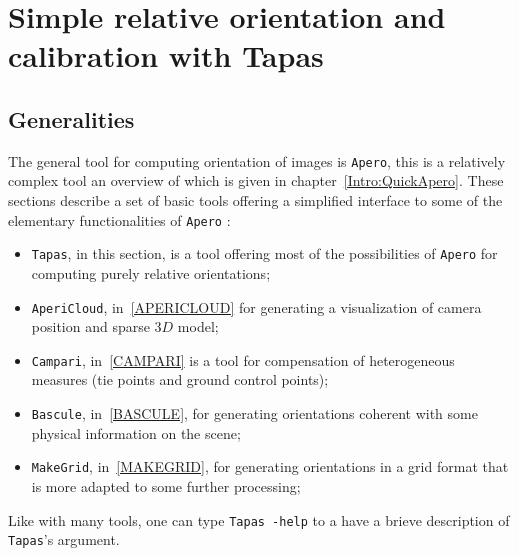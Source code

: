 
\section{Simple relative orientation and calibration with Tapas}

\label{Tapas}


\subsection{Generalities}

The general tool for computing orientation of images is {\tt Apero},
this is a relatively complex tool an overview of which is given in chapter~\ref{Intro:QuickApero}.
These sections describe a set of basic tools offering a simplified interface
to some of the elementary functionalities of {\tt Apero} :

\begin{itemize}
   \item {\tt Tapas}, in this section, is a tool offering most of the possibilities
	 of {\tt Apero} for computing purely relative orientations;

   \item {\tt AperiCloud}, in~\ref{APERICLOUD} for generating a visualization of camera
	 position and sparse $3D$ model;

   \item {\tt Campari}, in~\ref{CAMPARI} is a tool for compensation of heterogeneous measures (tie points and ground control points);

   \item {\tt Bascule}, in~\ref{BASCULE}, for generating orientations coherent with
	some physical information on the scene;

   \item {\tt MakeGrid}, in~\ref{MAKEGRID}, for generating   orientations  in a grid
	 format that is more adapted to some further processing;

\end{itemize}

Like with many tools, one can type {\tt Tapas -help} to a have a brieve description
of {\tt Tapas}'s argument.

